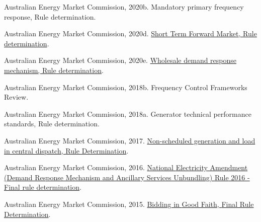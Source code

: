\documentclass[12pt,a4paper,]{report}
\newlength{\cslhangindent}
\newenvironment{CSLReferences}[2] %
 {%
  \setlength{\parindent}{0pt}
  \ifodd #1 \everypar{\setlength{\hangindent}{\cslhangindent}}\ignorespaces\fi
  \ifnum #2 > 0
  \setlength{\parskip}{#2\baselineskip}
  \fi
 }%
 {}
\begin{document}
\begin{CSLReferences}{1}{0}
\leavevmode{}%
Australian Energy Market Commission, 2020b. Mandatory primary frequency
response, {Rule} determination.

\leavevmode{}%
Australian Energy Market Commission, 2020d.
\href{https://www.aemc.gov.au/sites/default/files/documents/final_determination_-_short_term_forward_market_-_clean.pdf}{Short
{Term Forward Market}, {Rule} determination}.

\leavevmode{}%
Australian Energy Market Commission, 2020e.
\href{https://www.aemc.gov.au/sites/default/files/documents/final_determination_-_for_publication.pdf}{Wholesale
demand response mechanism, {Rule} determination}.

\leavevmode{}%
Australian Energy Market Commission, 2018b. Frequency {Control
Frameworks Review}.

\leavevmode{}%
Australian Energy Market Commission, 2018a. Generator technical
performance standards, {Rule} determination.

\leavevmode{}%
Australian Energy Market Commission, 2017.
\href{https://www.aemc.gov.au/sites/default/files/content/0bcaf68c-8449-4ce0-aaa6-da223ca6e01c/Final-Determination-ERC0203-Non-scheduled-generation-and-load.pdf}{Non-scheduled
generation and load in central dispatch, {Rule Determination}}.

\leavevmode{}%
Australian Energy Market Commission, 2016.
\href{https://www.aemc.gov.au/sites/default/files/content/68cb8114-113d-4d96-91dc-5cb4b0f9e0ae/ERC0186-DRM-and-ASU-Final-rule-determination-FINAL.PDF}{National
{Electricity Amendment} ({Demand Response Mechanism} and {Ancillary
Services Unbundling}) {Rule} 2016 - {Final} rule determination}.

\leavevmode{}%
Australian Energy Market Commission, 2015.
\href{https://www.aemc.gov.au/sites/default/files/content/815f277c-a015-47d0-bc13-ce3d5faaf96d/Final-Determination.pdf}{Bidding
in {Good Faith}, {Final Rule Determination}}.


\end{CSLReferences}
\end{document}
